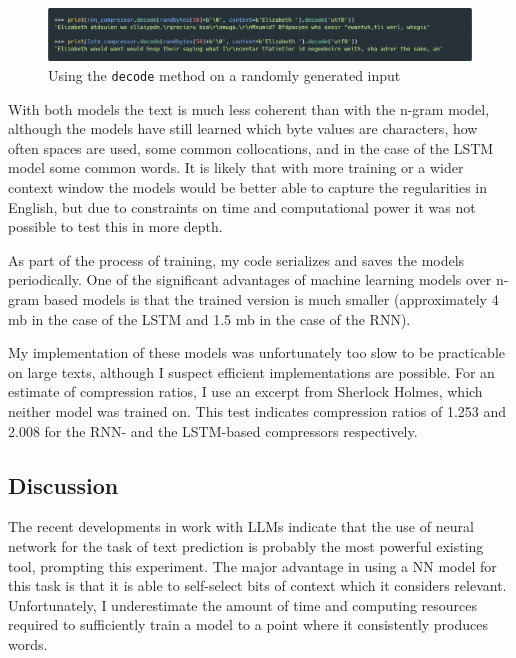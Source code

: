 \begin{figure}[h]
\centering
\includegraphics[width=\textwidth]{img/ML_decoding_randomness.png}
\caption{Using the \texttt{decode} method on a randomly generated input}
\label{fig:ML_decoding_randomness}
\end{figure}

With both models the text is much less coherent than with the n-gram model, although the models have still learned which byte values are characters, how often spaces are used, some common collocations, and in the case of the LSTM model some common words. It is likely that with more training or a wider context window the models would be better able to capture the regularities in English, but due to constraints on time and computational power it was not possible to test this in more depth.

As part of the process of training, my code serializes and saves the models periodically. One of the significant advantages of machine learning models over n-gram based models is that the trained version is much smaller (approximately 4 mb in the case of the LSTM and 1.5 mb in the case of the RNN).

My implementation of these models was unfortunately too slow to be practicable on large texts, although I suspect efficient implementations are possible. For an estimate of compression ratios, I use an excerpt from Sherlock Holmes, which neither model was trained on. This test indicates compression ratios of 1.253 and 2.008 for the RNN- and the LSTM-based compressors respectively.


\subsection{Discussion}

The recent developments in work with LLMs indicate that the use of neural network for the task of text prediction is probably the most powerful existing tool, prompting this experiment. The major advantage in using a NN model for this task is that it is able to self-select bits of context which it considers relevant. Unfortunately, I underestimate the amount of time and computing resources required to sufficiently train a model to a point where it consistently produces words.

